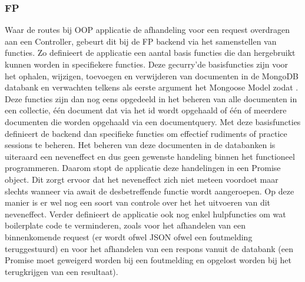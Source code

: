 \subsubsection{FP}
Waar de routes bij OOP applicatie de afhandeling voor een request overdragen aan een Controller, gebeurt dit bij de FP backend via het samenstellen van functies. Zo definieert de applicatie een aantal basis functies die dan hergebruikt kunnen worden in specifiekere functies. Deze gecurry'de basisfuncties zijn voor het ophalen, wijzigen, toevoegen en verwijderen van documenten in de MongoDB databank en verwachten telkens als eerste argument het Mongoose Model zodat . Deze functies zijn dan nog eens opgedeeld in het beheren van alle documenten in een collectie, één document dat via het id wordt opgehaald of één of meerdere documenten die worden opgehaald via een documentquery. Met deze basisfuncties definieert de backend dan specifieke functies om effectief rudiments of practice sessions te beheren. Het beheren van deze documenten in de databanken is uiteraard een neveneffect en dus geen gewenste handeling binnen het functioneel programmeren. Daarom stopt de applicatie deze handelingen in een Promise object. Dit zorgt ervoor dat het neveneffect zich niet meteen voordoet maar slechts wanneer via await de desbetreffende functie wordt aangeroepen. Op deze manier is er wel nog een soort van controle over het het uitvoeren van dit neveneffect. Verder definieert de applicatie ook nog enkel hulpfuncties om wat boilerplate code te verminderen, zoals voor het afhandelen van een binnenkomende request (er wordt ofwel JSON ofwel een foutmelding teruggestuurd) en voor het afhandelen van een respons vanuit de databank (een Promise moet geweigerd worden bij een foutmelding en opgelost worden bij het terugkrijgen van een resultaat).